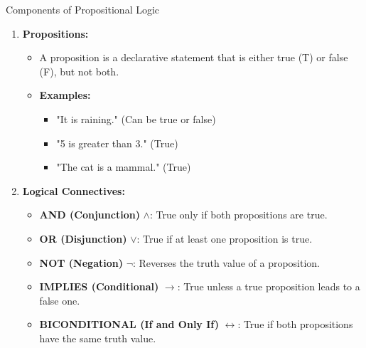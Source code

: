 \documentclass[aspectratio=169]{beamer}
\begin{document}
\begin{frame}[fragile]{Components of Propositional Logic}
    \begin{enumerate}
        \item \textbf{Propositions:}
        \begin{itemize}
            \item A proposition is a declarative statement that is either true (T) or false (F), but not both.
            \item \textbf{Examples:}
            \begin{itemize}
                \item "It is raining." (Can be true or false)
                \item "5 is greater than 3." (True)
                \item "The cat is a mammal." (True)
            \end{itemize}
        \end{itemize}
        
        \item \textbf{Logical Connectives:}
        \begin{itemize}
            \item \textbf{AND (Conjunction)} $\land$: True only if both propositions are true.
            \item \textbf{OR (Disjunction)} $\lor$: True if at least one proposition is true.
            \item \textbf{NOT (Negation)} $\neg$: Reverses the truth value of a proposition.
            \item \textbf{IMPLIES (Conditional)} $\rightarrow$: True unless a true proposition leads to a false one.
            \item \textbf{BICONDITIONAL (If and Only If)} $\leftrightarrow$: True if both propositions have the same truth value.
        \end{itemize}
    \end{enumerate}
\end{frame}
\end{document}

